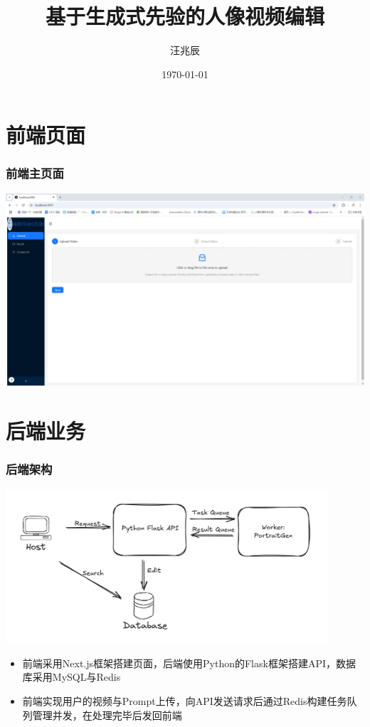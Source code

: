 \documentclass{beamer}
\title{基于生成式先验的人像视频编辑}
\author{汪兆辰}
\date{\ukdate\today}
\begin{document}
\begin{frame}
    \titlepage
\end{frame}

\section{前端页面}

\begin{frame}
    \frametitle{前端主页面}
    \includegraphics[width=\textwidth]{pic2.png}
\end{frame}

\section{后端业务}

\begin{frame}
    \frametitle{后端架构}
    \includegraphics[width=0.9\textwidth]{pic1.png}
    \begin{itemize}
        \item 前端采用Next.js框架搭建页面，后端使用Python的Flask框架搭建API，数据库采用MySQL与Redis
        \item 前端实现用户的视频与Prompt上传，向API发送请求后通过Redis构建任务队列管理并发，在处理完毕后发回前端
    \end{itemize}

\end{frame}
\end{document}
